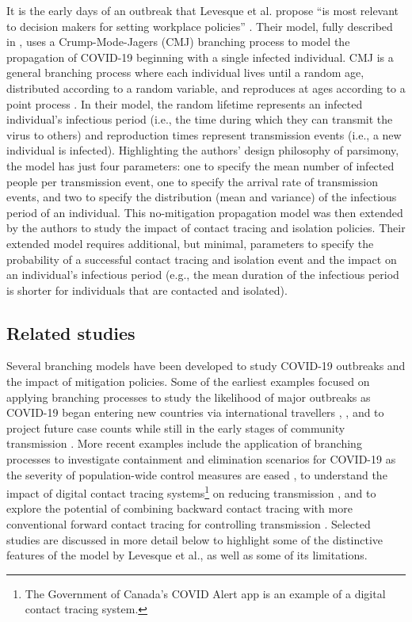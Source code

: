 \documentclass[sr]{drdc-report}
\begin{document}
It is the early days of an outbreak that Levesque et al. propose “is most relevant to decision makers for setting workplace policies” \cite{LevesquePaper}. Their model, fully described in \cite{LevesquePaper}, uses a Crump-Mode-Jagers (CMJ) branching process to model the propagation of COVID-19 beginning with a single infected individual. CMJ is a general branching process where each individual lives until a random age, distributed according to a random variable, and reproduces at ages according to a point process \cite{Ball}. In their model, the random lifetime represents an infected individual’s infectious period (i.e., the time during which they can transmit the virus to others) and reproduction times represent transmission events (i.e., a new individual is infected). Highlighting the authors’ design philosophy of parsimony, the model has just four parameters: one to specify the mean number of infected people per transmission event, one to specify the arrival rate of transmission events, and two to specify the distribution (mean and variance) of the infectious period of an individual. This no-mitigation propagation model was then extended by the authors to study the impact of contact tracing and isolation policies. Their extended model requires additional, but minimal, parameters to specify the probability of a successful contact tracing and isolation event and the impact on an individual’s infectious period (e.g., the mean duration of the infectious period is shorter for individuals that are contacted and isolated).  

 

\subsection{Related studies} 

 

Several branching models have been developed to study COVID-19 outbreaks and the impact of mitigation policies. Some of the earliest examples focused on applying branching processes to study the likelihood of major outbreaks as COVID-19 began entering new countries via international travellers \cite{Boldog}, \cite{Hellewell}, \cite{Kucharski} and to project future case counts while still in the early stages of community transmission \cite{Pearson}. More recent examples include the application of branching processes to investigate containment and elimination scenarios for COVID-19 as the severity of population-wide control measures are eased \cite{Aotearoa}, to understand the impact of digital contact tracing systems{\footnote{The Government of Canada’s COVID Alert app \cite{alert} is an example of a digital contact tracing system.}} on reducing transmission \cite{PlankDigital}, and to explore the potential of combining backward contact tracing{\footnotemark} with more conventional forward contact tracing for controlling transmission \cite{Endo}. Selected studies are discussed in more detail below to highlight some of the distinctive features of the model by Levesque et al., as well as some of its limitations. 
\end{document}
